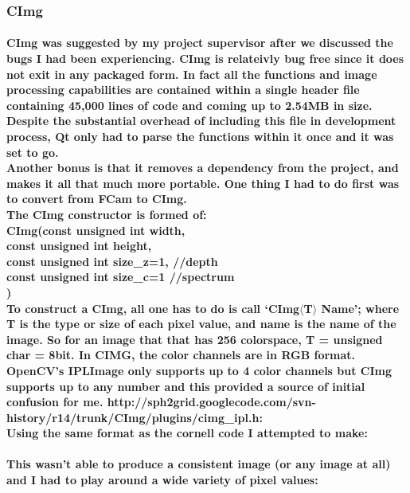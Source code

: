 \subsubsection{CImg}
\paragraph{CImg was suggested by my project supervisor after we discussed the bugs I had been experiencing. CImg is relateivly bug free since it does not exit in any packaged form. In fact all the functions and image processing capabilities are contained within a single header file containing 45,000 lines of code and coming up to 2.54MB in size. \\Despite the substantial overhead of including this file in development process, Qt only had to parse the functions within it once and it was set to go.
\\Another bonus is that it removes a dependency from the project, and makes it all that much more portable. One thing I had to do first was to convert from FCam to CImg.
\\The CImg constructor is formed of:\\
CImg(const unsigned int width,\\
\tab const unsigned int height,\\
\tab const unsigned int size\_z=1, //depth\\
\tab const unsigned int size\_c=1 //spectrum\\
)\\
To construct a CImg, all one has to do is call ‘CImg\(\langle\)T\(\rangle\) Name’; where T is the type or size of each pixel value, and name is the name of the image. So for an image that that has 256 colorspace, T = unsigned char = 8bit.
In CIMG, the color channels are in RGB format. OpenCV's IPLImage only supports up to 4 color channels but CImg supports up to any number and this provided a source of initial confusion for me.
http://sph2grid.googlecode.com/svn-history/r14/trunk/CImg/plugins/cimg\_ipl.h:\\
Using the same format as the cornell code I attempted to make:}
\begin{frame}[fragile]

\end{frame}
\paragraph{This wasn't able to produce a consistent image (or any image at all) and I had to play around a wide variety of pixel values:}
\begin{frame}[fragile]

\end{frame}
